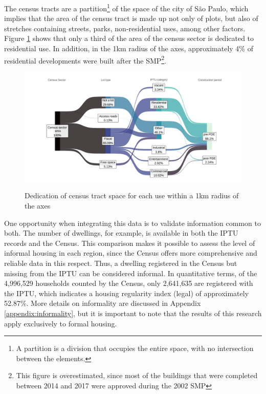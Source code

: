 The census tracts are a partition\footnote{A partition is a division that occupies the entire space, with no intersection between the elements.} of the space of the city of São Paulo, which implies that the area of the census tract is made up not only of plots, but also of stretches containing streets, parks, non-residential uses, among other factors. Figure \ref{fig:area-sector} shows that only a third of the area of the census sector is dedicated to residential use. In addition, in the 1km radius of the axes, approximately 4\% of residential developments were built after the SMP\footnote{This figure is overestimated, since most of the buildings that were completed between 2014 and 2017 were approved during the 2002 SMP}.
 
\begin{figure}[h]
    \centering
    \caption{Dedication of census tract space for each use within a 1km radius of the axes}
    \includegraphics[width = \linewidth]{figuras/area_setor.pdf}
    \label{fig:area-sector}
\end{figure}

One opportunity when integrating this data is to validate information common to both. The number of dwellings, for example, is available in both the IPTU records and the Census. This comparison makes it possible to assess the level of informal housing in each region, since the Census offers more comprehensive and reliable data in this respect. Thus, a dwelling registered in the Census but missing from the IPTU can be considered informal. In quantitative terms, of the 4,996,529 households counted by the Census, only 2,641,635 are registered with the IPTU, which indicates a housing regularity index (legal) of approximately 52.87\%. More details on informality are discussed in Appendix \ref{appendix:informality}, but it is important to note that the results of this research apply exclusively to formal housing.




